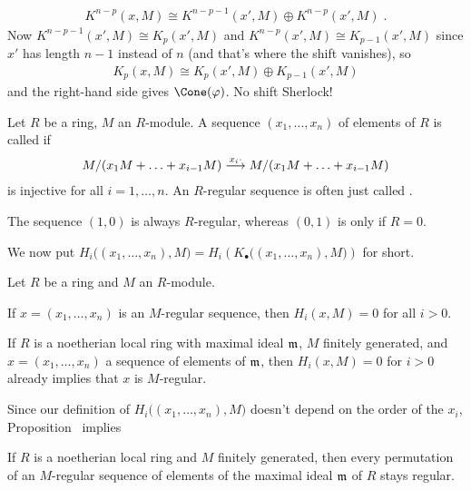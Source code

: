\documentclass[a4paper,parskip=half,numbers=enddot, DIV=12]{scrreprt}
\begin{document}
\begin{align*}
	K^{n-p}(x,M)\cong K^{n-p-1}(x',M)\oplus K^{n-p}(x',M)\;.
\end{align*}
Now $K^{n-p-1}(x',M)\cong K_p(x',M)$ and $K^{n-p}(x',M)\cong K_{p-1}(x',M)$ since $x'$ has length $n-1$ instead of $n$ (and that's where the shift vanishes), so
\begin{align*}
	K_p(x,M)\cong K_p(x',M)\oplus K_{p-1}(x',M)
\end{align*}
and the right-hand side gives $\Cone(\phi)$. No shift Sherlock!
\begin{defi}
	Let $R$ be a ring, $M$ an $R$-module. A sequence $(x_1,\ldots,x_n)$ of elements of $R$ is called  if
	\begin{align*}
		M/(x_1M+\ldots+x_{i-1}M)\morphism[x_i\cdot ]M/(x_1M+\ldots+x_{i-1}M)
	\end{align*}
	is injective for all $i=1,\ldots,n$. An $R$-regular sequence is often just called .
\end{defi}
\begin{example}
	The sequence $(1,0)$ is always $R$-regular, whereas $(0,1)$ is only if $R=0$.
\end{example}
We now put $H_i\big((x_1,\ldots,x_n),M\big)=H_i\left(K_\bullet\big((x_1,\ldots,x_n),M\big)\right)$ for short.
\begin{prop}
	Let $R$ be a ring and $M$ an $R$-module.
	\begin{alphanumerate}
		\item If $x=(x_1,\ldots,x_n)$ is an $M$-regular sequence, then $H_i(x,M)=0$ for all $i>0$.
		\item If $R$ is a noetherian local ring with maximal ideal $\mathfrak{m}$, $M$ finitely generated, and $x=(x_1,\ldots,x_n)$ a sequence of elements of $\mathfrak{m}$, then $H_i(x,M)=0$ for $i>0$ already implies that $x$ is $M$-regular.
	\end{alphanumerate}
\end{prop}
Since our definition of $H_i\big((x_1,\ldots,x_n),M\big)$ doesn't depend on the order of the $x_i$, Proposition~ implies
\begin{cor}
	If $R$ is a noetherian local ring and $M$ finitely generated, then every permutation of an $M$-regular sequence of elements of the maximal ideal $\mathfrak{m}$ of $R$ stays regular.
\end{cor}
\end{document}

